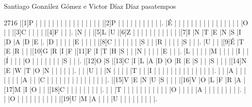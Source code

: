 \Titular*%
{Pasatempos}%
{Santiago González Gómez e Victor Díaz Díaz}%
{pasatempos}%
{}%

\begin{Puzzle}{27}{16}
|[1]P  |{}    |{}    |{}    |{}    |{}    |{}    |{}    |{}    |{}    |{}    |{}    |{}    |{}    |{}    |{}    |{}    |[2]P  |{}    |{}    |{}    |{}    |{}    |{}    |{}    |{}    |{}   |{} |.
|É     |{}    |{}    |{}    |{}    |{}    |{}    |{}    |{}    |{}    |{}    |{}    |{}    |{}    |{}    |{}    |{}    |O     |{}    |{}    |[3]C  |{}    |{}    |{}    |{}    |[4]F  |{}   |{} |.
|N     |{}    |{}    |[5]L  |U     |[6]Z  |{}    |{}    |{}    |{}    |{}    |{}    |{}    |{}    |{}    |{}    |{}    |[7]I  |N     |T     |E     |N     |S     |I     |D     |A     |D    |E  |.
|D     |{}    |{}    |{}    |{}    |E     |{}    |{}    |{}    |{}    |[8]C  |{}    |{}    |{}    |{}    |{}    |{}    |S     |{}    |{}    |R     |{}    |{}    |{}    |{}    |S     |{}   |{} |.
|U     |{}    |{}    |[9]É  |T     |E     |R     |{}    |{}    |[10]G |R     |I     |F     |[11]F |I     |T     |H     |S     |{}    |{}    |N     |{}    |{}    |{}    |{}    |E     |{}   |{} |.
|L     |{}    |{}    |{}    |{}    |M     |{}    |{}    |{}    |{}    |I     |{}    |{}    |Í     |{}    |{}    |{}    |O     |{}    |{}    |{}    |{}    |{}    |{}    |{}    |S     |{}   |{} |.
|[12]O |S     |[13]C |I     |L     |A     |D     |O     |R     |E     |S     |{}    |{}    |S     |{}    |{}    |{}    |[14]N |E     |W     |T     |O     |N     |{}    |{}    |{}    |{}   |{} |.
|{}    |{}    |U     |{}    |{}    |N     |{}    |{}    |{}    |{}    |T     |{}    |{}    |I     |{}    |{}    |{}    |{}    |{}    |{}    |{}    |{}    |{}    |{}    |{}    |{}    |{}   |{} |.
|{}    |{}    |A     |{}    |{}    |{}    |{}    |{}    |{}    |{}    |A     |{}    |{}    |C     |{}    |{}    |{}    |{}    |{}    |{}    |{}    |{}    |{}    |{}    |{}    |{}    |{}   |{} |.
|[15]V |E     |N     |U     |S     |{}    |{}    |{}    |[16]V |O     |L     |F     |R     |A     |[17]M |I     |O     |{}    |{}    |[18]C |{}    |{}    |{}    |{}    |{}    |{}    |{}   |{} |.
|{}    |{}    |T     |{}    |{}    |{}    |{}    |{}    |{}    |{}    |{}    |{}    |{}    |{}    |O     |{}    |{}    |{}    |{}    |A     |{}    |{}    |{}    |{}    |{}    |{}    |{}   |{} |.
|{}    |{}    |O     |{}    |{}    |{}    |{}    |{}    |{}    |{}    |{}    |{}    |{}    |[19]U |M     |A     |{}    |{}    |{}    |U     |{}    |{}    |{}    |{}    |{}    |{}    |{}   |{} |.

\end{Puzzle}
